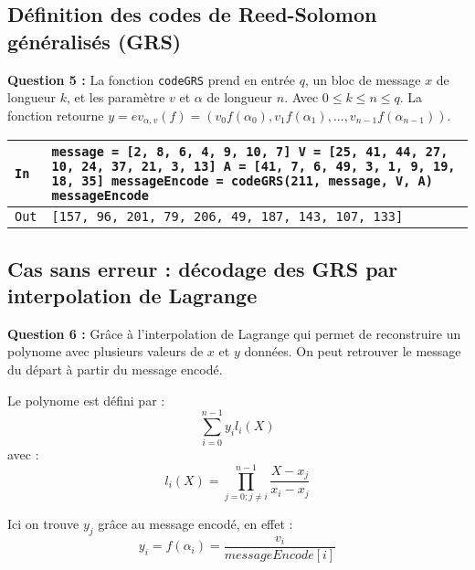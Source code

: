 \documentclass[titlepage]{article}
\begin{document}
        \subsection{Définition des codes de Reed-Solomon \\ généralisés (GRS)}

        \textbf{Question 5 :}
        La fonction \texttt{codeGRS} prend en entrée $q$, un bloc de message $x$ de longueur $k$, et les paramètre $v$ et $\alpha$ de longueur $n$.
        Avec $0 \leqslant k \leqslant n \leqslant q$. La fonction retourne $y = ev_{\alpha,v}(f) = (v_0f(\alpha_0), v_1f(\alpha_1), ..., v_{n-1}f(\alpha_{n-1}))$.

        

        \begin{tabularx}{12cm}{|p{0.60cm}|X|}
            \hline
            \rowcolor{gray}
            \texttt{In}
            & 
            \texttt{message = [2, 8, 6, 4, 9, 10, 7] \newline
            V = [25, 41, 44, 27, 10, 24, 37, 21, 3, 13] \newline
A =         [41, 7, 6, 49, 3, 1, 9, 19, 18, 35] \newline
            messageEncode = codeGRS(211, message, V, A) \newline
            messageEncode}
            \\
            \hline
            \texttt{Out}
            &
            \texttt{[157, 96, 201, 79, 206, 49, 187, 143, 107, 133]}
            \\
            \hline
        \end{tabularx}
        \bigbreak

        \subsection{Cas sans erreur : décodage des GRS par interpolation de Lagrange}
        \textbf{Question 6 :}
        Grâce à l'interpolation de Lagrange qui permet de reconstruire un polynome avec plusieurs valeurs de $x$ et $y$ données. 
        On peut retrouver le message du départ à partir du message encodé.

        Le polynome est défini par :
        \[\sum_{i=0}^{n-1}y_il_i(X)\]
        avec :
        \[l_i(X) = \prod_{j = 0; j \neq i}^{n - 1}\frac{X-x_j}{x_i-x_j} \]

        Ici on trouve $y_j$ grâce au message encodé, en effet : 
        \[y_i = f(\alpha_i) = \frac{v_i}{messageEncode[i]}\]
\end{document}
